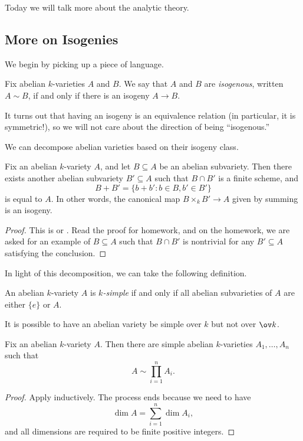 \documentclass[../notes.tex]{subfiles}
\begin{document}
Today we will talk more about the analytic theory.

\subsection{More on Isogenies}
We begin by picking up a piece of language.
\begin{definition}[isogenous]
	Fix abelian $k$-varieties $A$ and $B$. We say that $A$ and $B$ are \textit{isogenous}, written $A\sim B$, if and only if there is an isogeny $A\to B$.
\end{definition}
\begin{remark}
	It turns out that having an isogeny is an equivalence relation (in particular, it is symmetric!), so we will not care about the direction of being ``isogenous.''
\end{remark}
We can decompose abelian varieties based on their isogeny class.
\begin{theorem} \label{thm:poincare-red}
	Fix an abelian $k$-variety $A$, and let $B\subseteq A$ be an abelian subvariety. Then there exists another abelian subvariety $B'\subseteq A$ such that $B\cap B'$ is a finite scheme, and
	\[B+B'=\{b+b':b\in B,b'\in B'\}\]
	is equal to $A$. In other words, the canonical map $B\times_k B'\to A$ given by summing is an isogeny.
\end{theorem}
\begin{proof}
	This is \cite[p.~160]{mumford} or \cite[Theorem~2.12]{milne-cm}. Read the proof for homework, and on the homework, we are asked for an example of $B\subseteq A$ such that $B\cap B'$ is nontrivial for any $B'\subseteq A$ satisfying the conclusion.
\end{proof}
In light of this decomposition, we can take the following definition.
\begin{definition}[simple]
	An abelian $k$-variety $A$ is \textit{$k$-simple} if and only if all abelian subvarieties of $A$ are either $\{e\}$ or $A$.
\end{definition}
\begin{remark}
	It is possible to have an abelian variety be simple over $k$ but not over $\ov k$.
\end{remark}
\begin{corollary}
	Fix an abelian $k$-variety $A$. Then there are simple abelian $k$-varieties $A_1,\ldots,A_n$ such that
	\[A\sim\prod_{i=1}^nA_i.\]
\end{corollary}
\begin{proof}
	Apply  inductively. The process ends because we need to have
	\[\dim A=\sum_{i=1}^n\dim A_i,\]
	and all dimensions are required to be finite positive integers.
\end{proof}
\end{document}
